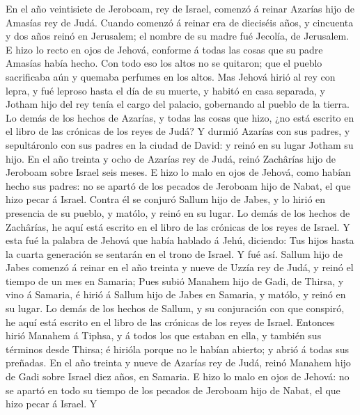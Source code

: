  En el año veintisiete de Jeroboam, rey de Israel, comenzó
á reinar Azarías hijo de Amasías rey de Judá.  Cuando
comenzó á reinar era de dieciséis años, y cincuenta y dos años reinó en
Jerusalem; el nombre de su madre fué Jecolía, de Jerusalem.
 E hizo lo recto en ojos de Jehová, conforme á todas las
cosas que su padre Amasías había hecho.  Con todo eso los
altos no se quitaron; que el pueblo sacrificaba aún y quemaba perfumes
en los altos.  Mas Jehová hirió al rey con lepra, y fué
leproso hasta el día de su muerte, y habitó en casa separada, y Jotham
hijo del rey tenía el cargo del palacio, gobernando al pueblo de la
tierra.  Lo demás de los hechos de Azarías, y todas las
cosas que hizo, ¿no está escrito en el libro de las crónicas de los
reyes de Judá?  Y durmió Azarías con sus padres, y
sepultáronlo con sus padres en la ciudad de David: y reinó en su lugar
Jotham su hijo.  En el año treinta y ocho de Azarías rey
de Judá, reinó Zachârías hijo de Jeroboam sobre Israel seis meses.
 E hizo lo malo en ojos de Jehová, como habían hecho sus
padres: no se apartó de los pecados de Jeroboam hijo de Nabat, el que
hizo pecar á Israel.  Contra él se conjuró Sallum hijo de
Jabes, y lo hirió en presencia de su pueblo, y matólo, y reinó en su
lugar.  Lo demás de los hechos de Zachârías, he aquí está
escrito en el libro de las crónicas de los reyes de Israel.
 Y esta fué la palabra de Jehová que había hablado á
Jehú, diciendo: Tus hijos hasta la cuarta generación se sentarán en el
trono de Israel. Y fué así.  Sallum hijo de Jabes comenzó
á reinar en el año treinta y nueve de Uzzía rey de Judá, y reinó el
tiempo de un mes en Samaria;  Pues subió Manahem hijo de
Gadi, de Thirsa, y vino á Samaria, é hirió á Sallum hijo de Jabes en
Samaria, y matólo, y reinó en su lugar.  Lo demás de los
hechos de Sallum, y su conjuración con que conspiró, he aquí está
escrito en el libro de las crónicas de los reyes de Israel.
 Entonces hirió Manahem á Tiphsa, y á todos los que
estaban en ella, y también sus términos desde Thirsa; é hirióla porque
no le habían abierto; y abrió á todas sus preñadas.  En
el año treinta y nueve de Azarías rey de Judá, reinó Manahem hijo de
Gadi sobre Israel diez años, en Samaria.  E hizo lo malo
en ojos de Jehová: no se apartó en todo su tiempo de los pecados de
Jeroboam hijo de Nabat, el que hizo pecar á Israel.  Y
